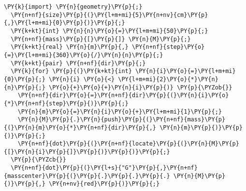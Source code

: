 \begin{Verbatim}[commandchars=\\\{\}]
  \PY{k}{import} \PY{n}{geometry}\PY{p}{;}
  \PY{n+nf}{size}\PY{p}{(}\PY{l+m+mi}{5}\PY{n+nv}{cm}\PY{p}{,}\PY{l+m+mi}{0}\PY{p}{)}\PY{p}{;}
  \PY{k+kt}{int} \PY{n}{n}\PY{o}{=}\PY{l+m+mi}{50}\PY{p}{;}
  \PY{n+nf}{mass}\PY{p}{[}\PY{p}{]} \PY{n}{M}\PY{p}{;}
  \PY{k+kt}{real} \PY{n}{m}\PY{p}{,} \PY{n+nf}{step}\PY{o}{=}\PY{l+m+mi}{360}\PY{o}{/}\PY{n}{n}\PY{p}{;}
  \PY{k+kt}{pair} \PY{n+nf}{dir}\PY{p}{;}
  \PY{k}{for} \PY{p}{(}\PY{k+kt}{int} \PY{n}{i}\PY{o}{=}\PY{l+m+mi}{0}\PY{p}{;} \PY{n}{i} \PY{o}{<} \PY{l+m+mi}{2}\PY{o}{*}\PY{n}{n}\PY{p}{;} \PY{o}{+}\PY{o}{+}\PY{n}{i}\PY{p}{)} \PY{p}{\PYZob{}}
    \PY{n+nf}{dir}\PY{o}{=}\PY{n+nf}{dir}\PY{p}{(}\PY{n}{i}\PY{o}{*}\PY{n+nf}{step}\PY{p}{)}\PY{p}{;}
    \PY{n}{m}\PY{o}{=}\PY{n}{i}\PY{o}{+}\PY{l+m+mi}{1}\PY{p}{;}
    \PY{n}{M}\PY{p}{.}\PY{n}{push}\PY{p}{(}\PY{n+nf}{mass}\PY{p}{(}\PY{n}{m}\PY{o}{*}\PY{n+nf}{dir}\PY{p}{,} \PY{n}{m}\PY{p}{)}\PY{p}{)}\PY{p}{;}
    \PY{n+nf}{dot}\PY{p}{(}\PY{n+nf}{locate}\PY{p}{(}\PY{n}{M}\PY{p}{[}\PY{n}{i}\PY{p}{]}\PY{p}{)}\PY{p}{)}\PY{p}{;}
  \PY{p}{\PYZcb{}}
  \PY{n+nf}{dot}\PY{p}{(}\PY{l+s}{"G"}\PY{p}{,}\PY{n+nf}{masscenter}\PY{p}{(}\PY{p}{.}\PY{p}{.}\PY{p}{.} \PY{n}{M}\PY{p}{)}\PY{p}{,} \PY{n+nv}{red}\PY{p}{)}\PY{p}{;}
\end{Verbatim}
